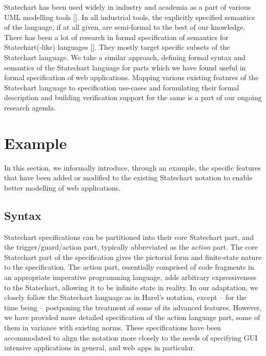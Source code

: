 \documentclass[12pt,a4paper]{article}
\begin{document}
Statechart has been used widely in industry and academia as a part of various UML modelling tools []. In all industrial tools, the explicitly specified semantics of the language, if at all given, are semi-formal to the best of our knowledge. There has been a lot of research in formal specification of semantics for Statechart(-like) languages []. They mostly target specific subsets of the Statechart language. We take a similar approach, defining formal syntax and semantics of the Statechart language for parts which we have found useful in formal specification of web applications. Mapping various existing features of the Statechart language to specification use-cases and formulating their formal description and building verification support for the same is a part of our ongoing research agenda.


\section{Example}
In this section, we informally introduce, through an example, the specific features that have been added or modified to the existing Statechart notation to enable better modelling of web applications.


\subsection{Syntax}
\begin{scriptsize}

\end{scriptsize}

Statechart specifications can be partitioned into their core Statechart part, and the trigger/guard/action part, typically abbreviated as the \emph{action} part. The core Statechart part of the specification gives the pictorial form and finite-state nature to the specification. The action part, essentially comprised of code fragments in an appropriate imperative programming language, adds arbitrary expressiveness to the Statechart, allowing it to be infinite state in reality. In our adaptation, we closely follow the Statechart language as in Harel's notation, except -- for the time being -- postponing the treatment of some of its advanced features. However, we have provided more detailed specification of the action language part, some of them in variance with existing norms. These specifications have been accommodated to align the notation more closely to the needs of specifying GUI intensive applications in general, and web apps in particular.
\end{document}
